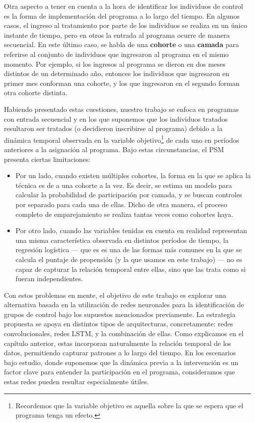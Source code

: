 \documentclass[../main.tex]{subfiles}
\begin{document}
Otra aspecto a tener en cuenta a la hora de identificar los individuos de control es la
forma de implementación del programa a lo largo del tiempo. En algunos casos, el ingreso
al tratamiento por parte de los individuos se realiza en un único instante de tiempo, pero
en otros la entrada al programa ocurre de manera secuencial. En este último caso, se habla
de una \textbf{cohorte} o una \textbf{camada} para referirse al conjunto de individuos que
ingresaron al programa en el mismo momento. Por ejemplo, si los ingresos al programa se
dieron en dos meses distintos de un determinado año, entonces los individuos que
ingresaron en primer mes conforman una cohorte, y los que ingresaron en el segundo forman
otra cohorte distinta.

Habiendo presentado estas cuestiones, nuestro trabajo se enfoca en programas con entrada
secuencial y en los que suponemos que los individuos tratados resultaron ser tratados (o
decidieron inscribirse al programa) debido a la dinámica temporal observada en la variable
objetivo\footnote{Recordemos que la variable objetivo es aquella sobre la que se espera
que el programa tenga un efecto.} de cada uno en períodos anteriores a la asignación al
programa. Bajo estas circunstancias, el PSM presenta ciertas limitaciones:
\begin{itemize}
    \item Por un lado, cuando existen múltiples cohortes, la forma en la que se aplica la
    técnica es de a una cohorte a la vez. Es decir, se estima un modelo para calcular la
    probabilidad de participación por camada, y se buscan controles por separado para cada
    una de ellas. Dicho de otra manera, el proceso completo de emparejamiento se realiza
    tantas veces como cohortes haya.
    \item Por otro lado, cuando las variables tenidas en cuenta en realidad representan
    una misma característica observada en distintos períodos de tiempo, la regresión
    logística — que es es una de las formas más comunes en la que se calcula el puntaje de
    propensión (y la que usamos en este trabajo) — no es capaz de capturar la relación
    temporal entre ellas, sino que las trata como si fueran independientes.
\end{itemize}

Con estos problemas en mente, el objetivo de este trabajo es explorar una alternativa
basada en la utilización de redes neuronales para la identificación de grupos de control
bajo los supuestos mencionados previamente. La estrategia propuesta se apoya en distintos
tipos de arquitecturas, concretamente: redes convolucionales, redes LSTM, y la combinación
de ellas. Como explicamos en el capítulo anterior, estas incorporan naturalmente la
relación temporal de los datos, permitiendo capturar patrones a lo largo del tiempo. En
los escenarios bajo estudio, donde suponemos que la dinámica previa a la intervención es
un factor clave para entender la participación en el programa, consideramos que estas
redes pueden resultar especialmente útiles.
\end{document}
